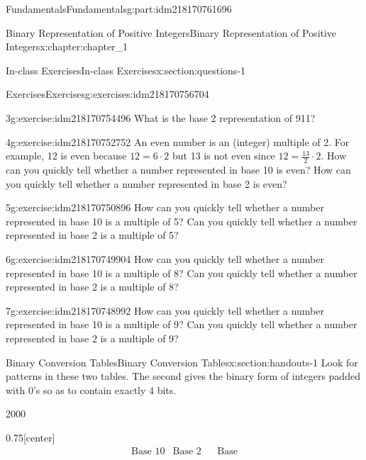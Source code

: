 \documentclass[oneside,10pt,]{book}
\numberwithin{equation}{section}
\begin{document}
\begin{partptx}{Fundamentals}{}{Fundamentals}{}{}{g:part:idm218170761696}
\begin{chapterptx}{Binary Representation of Positive Integers}{}{Binary Representation of Positive Integers}{}{}{x:chapter:chapter_1}
\begin{sectionptx}{In-class Exercises}{}{In-class Exercises}{}{}{x:section:questions-1}
\begin{exercises-subsection-numberless}{Exercises}{}{Exercises}{}{}{g:exercises:idm218170756704}
\begin{exercisegroup}
\begin{divisionexerciseeg}{3}{}{}{g:exercise:idm218170754496}
What is the base 2 representation of 911?%
\end{divisionexerciseeg}%
\begin{divisionexerciseeg}{4}{}{}{g:exercise:idm218170752752}%
An even number is an (integer) multiple of 2.  For example, 12 is even because \(12 = 6 \cdot 2\) but 13 is not even since \(12 = \frac{13}{2} \cdot 2\).  How can you quickly tell whether a number represented in base 10  is even?  How can you quickly tell whether a number represented in base 2  is even?%
\end{divisionexerciseeg}%
\begin{divisionexerciseeg}{5}{}{}{g:exercise:idm218170750896}%
How can you quickly tell whether a number represented in base 10  is a multiple of 5?  Can you quickly tell whether a number represented in base 2  is a multiple of 5?%
\end{divisionexerciseeg}%
\begin{divisionexerciseeg}{6}{}{}{g:exercise:idm218170749904}%
How can you quickly tell whether a number represented in base 10  is a multiple of 8? Can you quickly tell whether a number represented in base 2  is a multiple of 8?%
\end{divisionexerciseeg}%
\begin{divisionexerciseeg}{7}{}{}{g:exercise:idm218170748992}%
How can you quickly tell whether a number represented in base 10  is a multiple of 9?  Can you quickly tell whether a number represented in base 2  is a multiple of 9?%
\end{divisionexerciseeg}%
\end{exercisegroup}
\par\medskip\noindent
\end{exercises-subsection-numberless}
\end{sectionptx}
%
%
\typeout{************************************************}
\typeout{************************************************}
%
\begin{sectionptx}{Binary Conversion Tables}{}{Binary Conversion Tables}{}{}{x:section:handouts-1}
Look for patterns in these two tables. The second gives the binary form of integers padded with 0's so as to contain exactly 4 bits.%
\begin{sidebyside}{2}{0}{0}{0}%
\begin{sbspanel}{0.75}[center]%
%
\begin{equation*}
\begin{array}{ccccc}
\text{Base 10} & \text{Base
2} & \text{} & \text{Base
}
\end{array}
\end{equation*}
\end{sbspanel}
\end{sidebyside}
\end{sectionptx}
\end{chapterptx}
\end{partptx}
\end{document}
